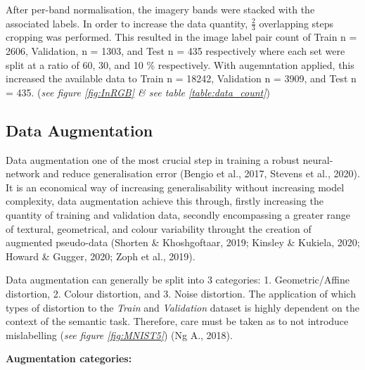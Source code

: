 \documentclass[11pt, a4paper, twoside]{report}
\begin{document}
After per-band normalisation, the imagery bands were stacked with the associated labels. In order to increase the data quantity, $\frac{2}{3}$ overlapping steps cropping was performed. This resulted in the image label pair count of Train n = 2606, Validation, n = 1303, and Test n = 435 respectively where each set were split at a ratio of 60, 30, and 10 \% respectively. With augemntation applied, this increased the available data to Train n = 18242, Validation n = 3909, and Test n = 435. (\textit{see figure \ref{fig:InRGB} \& see table \ref{table:data_count}})\\\par
\subsection{Data Augmentation}\label{DataAug}

Data augmentation one of the most crucial step in training a robust neural-network and reduce generalisation error (Bengio et al., 2017, Stevens et al., 2020). It is an economical way of increasing generalisability without increasing model complexity, data augmentation achieve this through, firstly increasing the quantity of training and validation data, secondly encompassing a greater range of textural, geometrical, and colour variability throught the creation of augmented pseudo-data (Shorten \& Khoshgoftaar, 2019; Kinsley \& Kukiela, 2020; Howard \& Gugger, 2020; Zoph et al., 2019).\\\par

Data augmentation can generally be split into 3 categories: 1. Geometric/Affine distortion, 2. Colour distortion, and 3. Noise distortion. The application of which types of distortion to the \textit{Train} and \textit{Validation} dataset is highly dependent on the context of the semantic task. Therefore, care must be taken as to not introduce mislabelling (\textit{see figure \ref{fig:MNIST5}}) (Ng A., 2018).\\\par

\textbf{Augmentation categories:}
\end{document}
